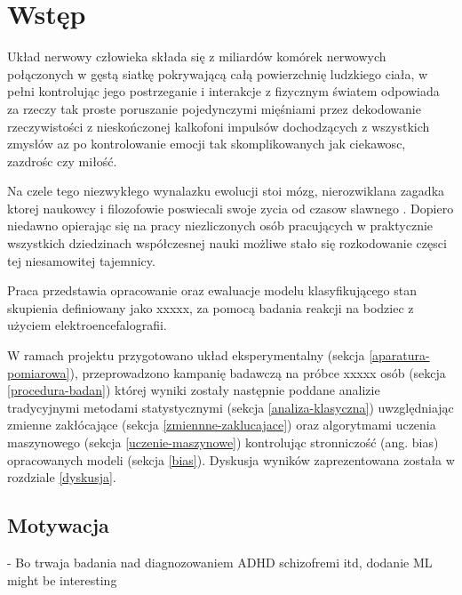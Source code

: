 \documentclass{./assets/wfis}
\begin{document}


\stronatytulowa

\begin{abstract}

\end{abstract}

\chapter{Wstęp}

Układ nerwowy człowieka składa się z miliardów komórek nerwowych połączonych w gęstą siatkę pokrywającą całą powierzchnię ludzkiego ciała, w pełni kontrolując jego postrzeganie i interakcje z fizycznym światem odpowiada za rzeczy tak proste poruszanie pojedynczymi mięśniami przez dekodowanie rzeczywistości z nieskończonej kalkofoni impulsów dochodzących z wszystkich zmysłów az po kontrolowanie emocji tak skomplikowanych jak ciekawosc, zazdrośc czy miłość.

Na czele tego niezwykłego wynalazku ewolucji stoi mózg, nierozwiklana zagadka ktorej naukowcy i filozofowie poswiecali swoje zycia od czasow slawnego  . Dopiero niedawno opierając się na pracy niezliczonych osób pracujących w praktycznie wszystkich dziedzinach współczesnej nauki możliwe stało się rozkodowanie częsci tej niesamowitej tajemnicy. 

Praca przedstawia opracowanie oraz ewaluacje modelu klasyfikującego stan skupienia definiowany jako  xxxxx, za pomocą badania reakcji na bodziec z użyciem elektroencefalografii. 

W ramach projektu przygotowano układ eksperymentalny (sekcja \ref{aparatura-pomiarowa}), przeprowadzono kampanię badawczą na próbce xxxxx osób (sekcja \ref{procedura-badan}) której wyniki zostały następnie poddane analizie tradycyjnymi metodami statystycznymi (sekcja \ref{analiza-klasyczna}) uwzględniając zmienne zakłócające (sekcja \ref{zmiennne-zaklucajace}) oraz algorytmami uczenia maszynowego (sekcja \ref{uczenie-maszynowe}) kontrolując stronniczość (ang. bias) opracowanych modeli (sekcja \ref{bias}). Dyskusja wyników zaprezentowana została w rozdziale \ref{dyskusja}.

\section{Motywacja}
- Bo trwaja badania nad diagnozowaniem ADHD schizofremi itd, dodanie ML might be interesting
\end{document}
